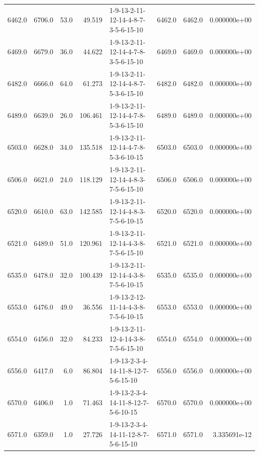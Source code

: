 \begin{tabular}{rrrrlrrr}
 6462.0 &  6706.0 &           53.0 &             49.519 &  1-9-13-2-11-12-14-4-8-7-3-5-6-15-10 &        6462.0 &          6462.0 &  0.000000e+00 \\
 6469.0 &  6679.0 &           36.0 &             44.622 &  1-9-13-2-11-12-14-4-7-8-3-5-6-15-10 &        6469.0 &          6469.0 &  0.000000e+00 \\
 6482.0 &  6666.0 &           64.0 &             61.273 &  1-9-13-2-11-12-14-4-8-7-5-3-6-15-10 &        6482.0 &          6482.0 &  0.000000e+00 \\
 6489.0 &  6639.0 &           26.0 &            106.461 &  1-9-13-2-11-12-14-4-7-8-5-3-6-15-10 &        6489.0 &          6489.0 &  0.000000e+00 \\
 6503.0 &  6628.0 &           34.0 &            135.518 &  1-9-13-2-11-12-14-4-7-8-5-3-6-10-15 &        6503.0 &          6503.0 &  0.000000e+00 \\
 6506.0 &  6621.0 &           24.0 &            118.129 &  1-9-13-2-11-12-14-4-8-3-7-5-6-15-10 &        6506.0 &          6506.0 &  0.000000e+00 \\
 6520.0 &  6610.0 &           63.0 &            142.585 &  1-9-13-2-11-12-14-4-8-3-7-5-6-10-15 &        6520.0 &          6520.0 &  0.000000e+00 \\
 6521.0 &  6489.0 &           51.0 &            120.961 &  1-9-13-2-11-12-14-4-3-8-7-5-6-15-10 &        6521.0 &          6521.0 &  0.000000e+00 \\
 6535.0 &  6478.0 &           32.0 &            100.439 &  1-9-13-2-11-12-14-4-3-8-7-5-6-10-15 &        6535.0 &          6535.0 &  0.000000e+00 \\
 6553.0 &  6476.0 &           49.0 &             36.556 &  1-9-13-2-12-11-14-4-3-8-7-5-6-10-15 &        6553.0 &          6553.0 &  0.000000e+00 \\
 6554.0 &  6456.0 &           32.0 &             84.233 &  1-9-13-2-11-12-4-14-3-8-7-5-6-15-10 &        6554.0 &          6554.0 &  0.000000e+00 \\
 6556.0 &  6417.0 &            6.0 &             86.804 &  1-9-13-2-3-4-14-11-8-12-7-5-6-15-10 &        6556.0 &          6556.0 &  0.000000e+00 \\
 6570.0 &  6406.0 &            1.0 &             71.463 &  1-9-13-2-3-4-14-11-8-12-7-5-6-10-15 &        6570.0 &          6570.0 &  0.000000e+00 \\
 6571.0 &  6359.0 &            1.0 &             27.726 &  1-9-13-2-3-4-14-11-12-8-7-5-6-15-10 &        6571.0 &          6571.0 &  3.335691e-12 \\

\end{tabular}
